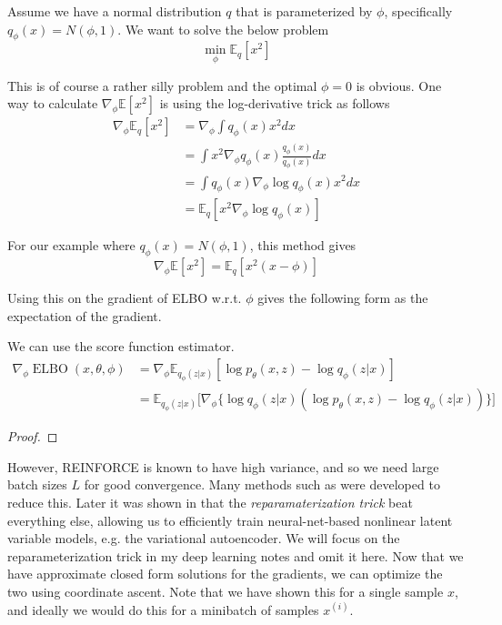 \documentclass{article}
\DeclareMathOperator{\elbo}{ELBO}
\begin{document}
  \begin{example}[Gradient of Expection of $f(x) = x^2$ w.r.t. Gaussian]
    Assume we have a normal distribution $q$ that is parameterized by $\phi$, specifically
    $q_\phi(x) = N(\phi, 1)$. We want to solve the below problem
    \begin{equation}
      \min_\phi \mathbb{E}_q[x^2]
    \end{equation}

    This is of course a rather silly problem and the optimal $\phi = 0$ is obvious. One way to calculate $\nabla_\phi \mathbb{E}[x^2]$ is using the log-derivative trick as follows
    \begin{align}
      \nabla_\phi \mathbb{E}_q[x^2] &= \nabla_\phi\int q_\phi(x)x^2dx \\
      &= \int x^2\nabla_\phi q_\phi(x)\frac{q_\phi(x)}{q_\phi(x)}dx \\
      &= \int q_\phi(x)\nabla_\phi\log q_\phi(x)x^2dx \\
      &= \mathbb{E}_q[x^2\nabla_\phi\log q_\phi(x)]
    \end{align}

    For our example where $q_\phi(x) = N(\phi, 1)$, this method gives
    \begin{equation}
      \nabla_\phi \mathbb{E}[x^2] = \mathbb{E}_q[x^2(x-\phi)]
    \end{equation}
  \end{example}

  Using this on the gradient of ELBO w.r.t. $\phi$ gives the following form as the expectation of the gradient. 

  \begin{lemma}
    We can use the score function estimator. 
    \begin{align}
      \nabla_\phi \elbo(x, \theta, \phi) & = \nabla_\phi \mathbb{E}_{q_\phi(z|x)}[\log p_\theta(x,z) - \log q_\phi(z|x)] \\
                                         & = \mathbb{E}_{q_\phi(z|x)}\big[ \nabla_\phi \big\{ \log q_\phi(z|x)(\log p_\theta(x,z) - \log q_\phi(z|x)) \big\} \big]
    \end{align}
  \end{lemma}
  \begin{proof}
  \end{proof}

  However, REINFORCE is known to have high variance, and so we need large batch sizes $L$ for good convergence. Many methods such as \cite{reduce, reduce2} were developed to reduce this. Later it was shown in \cite{vae1} that the \textit{reparamaterization trick} beat everything else, allowing us to efficiently train neural-net-based nonlinear latent variable models, e.g. the variational autoencoder. We will focus on the reparameterization trick in my deep learning notes and omit it here.  Now that we have approximate closed form solutions for the gradients, we can optimize the two using coordinate ascent. Note that we have shown this for a single sample $x$, and ideally we would do this for a minibatch of samples $x^{(i)}$. 
\end{document}
